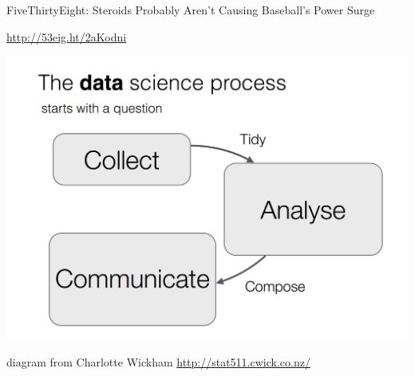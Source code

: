 \documentclass[xetex,mathserif,serif,aspectratio=169]{beamer}
\begin{document}




\begin{frame}[fragile]

FiveThirtyEight: Steroids Probably Aren't Causing Baseball's Power Surge

\begin{center}
\url{http://53eig.ht/2aKodni}
\end{center}

\end{frame}




\begin{frame}[fragile]

\begin{center}
\includegraphics[height=0.8\textheight]{img/diagram01.jpg}
\end{center}

{\footnotesize diagram from Charlotte Wickham \url{http://stat511.cwick.co.nz/}}

\end{frame}
\end{document}
